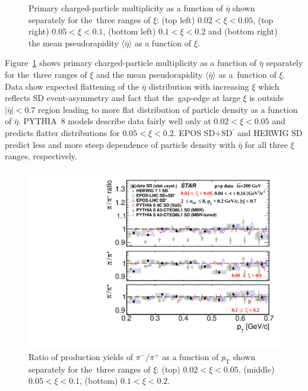 \begin{figure}[t!]
	\caption{Primary charged-particle multiplicity as a function of $\bar{\eta}$ shown  separately for the~three ranges of  $\xi$: (top left) $0.02<\xi<0.05$, (top right) $0.05<\xi<0.1$, (bottom left) $0.1<\xi<0.2$ and (bottom right) the mean pseudorapidity  $\langle\bar{\eta}\rangle$ as a function of $\xi$.}
	\label{fig:results_star_eta}
\end{figure}

Figure~\ref{fig:results_star_eta} shows primary charged-particle multiplicity as a function of $\bar{\eta}$ 
separately for the~three ranges of $\xi$ and the mean pseudorapidity $\langle \bar{\eta} \rangle$ as a~function of $\xi$. Data show expected flattening of the $\bar{\eta}$ distribution with increasing $\xi$ which reflects SD event-asymmetry and fact that the~gap-edge at large $\xi$ is outside $|\bar{\eta}|<0.7$ region leading to more flat distribution of particle density as a function of $\bar{\eta}$. %
PYTHIA~8 models describe data fairly well only at $0.02<\xi<0.05$ and predicts flatter distributions for $0.05<\xi<0.2$. EPOS SD+SD$^\prime$ and HERWIG SD predict less and more steep dependence of particle density with $\bar{\eta}$  for all three $\xi$ ranges, respectively. 



\begin{figure}[b!]
	\centering
	\includegraphics[width=.99\textwidth,page=1]{chapters/chrgSTAR/img/results/particleRatio_prt_0.pdf}
	\caption{Ratio of production yields of $\pi^-/\pi^+$ as a function of $p_\textrm{T}$ shown separately for the~three ranges of $\xi$: (top) $0.02<\xi<0.05$, (middle) $0.05<\xi<0.1$, (bottom) $0.1<\xi<0.2$.}
	\label{fig:results_star_pion}
	
\end{figure}

